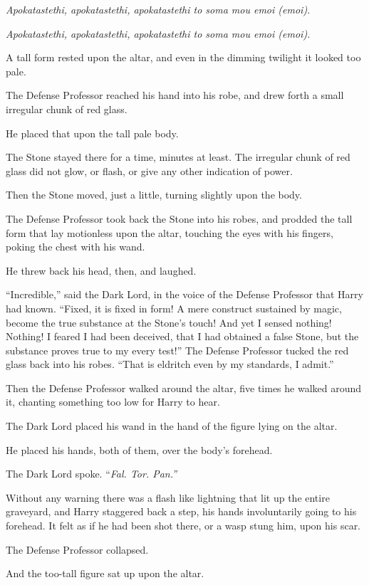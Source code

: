 \emph{Apokatastethi, apokatastethi, apokatastethi to soma mou emoi (emoi).}

\emph{Apokatastethi, apokatastethi, apokatastethi to soma mou emoi (emoi).}

A tall form rested upon the altar, and even in the dimming twilight it looked too pale.

The Defense Professor reached his hand into his robe, and drew forth a small irregular chunk of red glass.

He placed that upon the tall pale body.

The Stone stayed there for a time, minutes at least. The irregular chunk of red glass did not glow, or flash, or give any other indication of power.

Then the Stone moved, just a little, turning slightly upon the body.

The Defense Professor took back the Stone into his robes, and prodded the tall form that lay motionless upon the altar, touching the eyes with his fingers, poking the chest with his wand.

He threw back his head, then, and laughed.

``Incredible,'' said the Dark Lord, in the voice of the Defense Professor that Harry had known. ``Fixed, it is fixed in form! A mere construct sustained by magic, become the true substance at the Stone's touch! And yet I sensed nothing! Nothing! I feared I had been deceived, that I had obtained a false Stone, but the substance proves true to my every test!'' The Defense Professor tucked the red glass back into his robes. ``That is eldritch even by my standards, I admit.''

Then the Defense Professor walked around the altar, five times he walked around it, chanting something too low for Harry to hear.

The Dark Lord placed his wand in the hand of the figure lying on the altar.

He placed his hands, both of them, over the body's forehead.

The Dark Lord spoke. ``\emph{Fal. Tor. Pan.''}

Without any warning there was a flash like lightning that lit up the entire graveyard, and Harry staggered back a step, his hands involuntarily going to his forehead. It felt as if he had been shot there, or a wasp stung him, upon his scar.

The Defense Professor collapsed.

And the too-tall figure sat up upon the altar.

